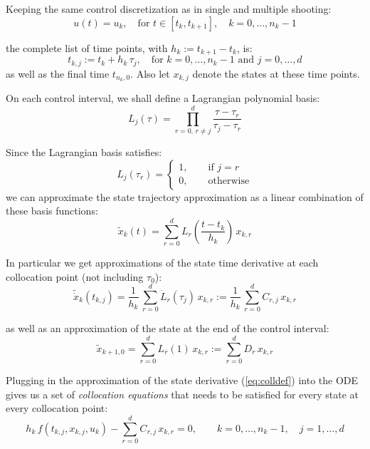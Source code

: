 \documentclass[a4paper,12pt]{book}
\begin{document}
Keeping the same control discretization as in single and multiple shooting:
\begin{equation}
 u(t) = u_k, \quad \text{for $t \in [t_k, t_{k+1}], \quad k=0,\ldots,n_k-1$}
\end{equation}

the complete list of time points, with $h_k := t_{k+1}-t_k$, is:
\begin{equation}
 t_{k,j} := t_k + h_k \, \tau_j, \quad \text{for $k=0,\ldots,n_k-1$ and $j=0,\ldots,d$}
\end{equation}
as well as the final time $t_{n_k,0}$. Also let $x_{k,j}$ denote the states at these time points.

On each control interval, we shall define a Lagrangian polynomial basis:
\begin{equation}
 L_j(\tau) = \prod_{r=0, \, r \ne j}^{d} \frac{\tau - \tau_{r}}{\tau_j - \tau_r}
\end{equation}

Since the Lagrangian basis satisfies:
\begin{equation}
 L_j(\tau_r) = \left\{
 \begin{array}{l}
  1, \qquad \text{if $j=r$} \\
  0, \qquad \text{otherwise}
 \end{array}
  \right.
\end{equation}
we can approximate the state trajectory approximation as a linear combination of these basis functions:
\begin{equation}
\tilde{x}_k(t) = \sum_{r=0}^{d}{L_r\left(\frac{t-t_k}{h_k}\right) \, x_{k,r}}
\end{equation}

In particular we get approximations of the state time derivative at each collocation point (not including $\tau_0$):
\begin{equation}
\tilde{\dot{x}}_k(t_{k,j}) = \frac{1}{h_k} \, \sum_{r=0}^{d}{\dot{L}_r(\tau_j) \, x_{k,r}} := \frac{1}{h_k} \, \sum_{r=0}^{d}{C_{r,j} \, x_{k,r}}
\label{eq:colldef}
\end{equation}

as well as an approximation of the state at the end of the control interval:
\begin{equation}
\tilde{x}_{k+1,0} = \sum_{r=0}^{d}{L_r(1) \, x_{k,r}} := \sum_{r=0}^{d}{D_r \, x_{k,r}}
\label{eq:contdef}
\end{equation}

Plugging in the approximation of the state derivative (\ref{eq:colldef}) into the ODE gives us a set of \emph{collocation equations} that needs to be satisfied for every state at every collocation point:
\begin{equation}
h_k \, f(t_{k,j},x_{k,j},u_k) - \sum_{r=0}^{d}{C_{r,j} \, x_{k,r}} = 0, \qquad k=0,\ldots,n_k-1, \quad j=1,\ldots,d
\end{equation}
\end{document}

